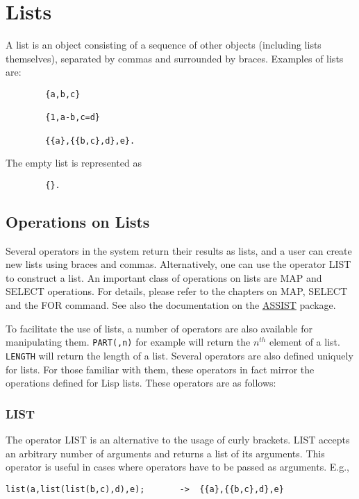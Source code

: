 \chapter{Lists}

A list is an object consisting of a sequence of other objects
(including lists themselves), separated by commas and surrounded by
braces.  Examples of lists are:
\begin{verbatim}
        {a,b,c}

        {1,a-b,c=d}

        {{a},{{b,c},d},e}.
\end{verbatim}
The empty list is represented as
\begin{verbatim}
        {}.
\end{verbatim}

\section{Operations on Lists}

Several operators in the system return their results as lists, and a user
can create new lists using braces and commas.  Alternatively, one can use
the operator LIST to construct a list.  An important class of operations
on lists are MAP and SELECT operations.  For details, please refer to the
chapters on MAP, SELECT and the FOR command.  See also the documentation
on the \hyperlink{ASSIST}{ASSIST} package.

To facilitate the use of
lists, a number of operators are also available for manipulating
them. \texttt{PART(,n)} for example will return the
$n^{th}$ element of a list. \texttt{LENGTH} will return the
length of a list.  Several operators are also defined uniquely for lists.
For those familiar with them, these operators in fact mirror the
operations defined for Lisp lists.  These operators are as follows:

\subsection{LIST}
\hypertarget{operator:LIST}{}

The operator LIST is an alternative to the usage of curly brackets. LIST
accepts an arbitrary number of arguments and returns a list
of its arguments. This operator is useful in cases where operators
have to be passed as arguments. E.g.,
\begin{verbatim}
list(a,list(list(b,c),d),e);       ->  {{a},{{b,c},d},e}
\end{verbatim}


